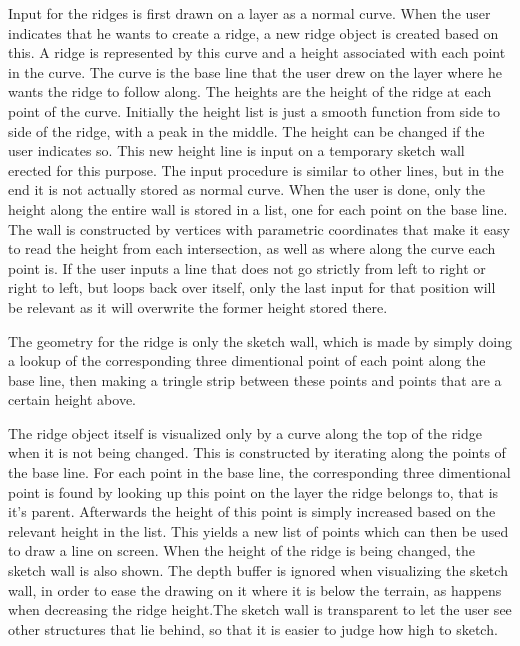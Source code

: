 \documentclass[a4paper,12pt]{report}
\begin{document}
Input for the ridges is first drawn on a layer as a normal curve. When the user indicates that he wants to create a ridge, a new ridge object is created based on this. A ridge is represented by this curve and a height associated with each point in the curve. The curve is the base line that the user drew on the layer where he wants the ridge to follow along. The heights are the height of the ridge at each point of the curve. Initially the height list is just a smooth function from side to side of the ridge, with a peak in the middle. The height can be changed if the user indicates so. This new height line is input on a temporary sketch wall erected for this purpose. The input procedure is similar to other lines, but in the end it is not actually stored as normal curve. When the user is done, only the height along the entire wall is stored in a list, one for each point on the base line. The wall is constructed by vertices with parametric coordinates that make it easy to read the height from each intersection, 
as 
well as where along the curve each point is. If the user inputs a line that does not go strictly from left to right or right to left, but loops back over itself, only the last input for that position will be relevant as it will overwrite the former height stored there.

The geometry for the ridge is only the sketch wall, which is made by simply doing a lookup of the corresponding three dimentional point of each point along the base line, then making a tringle strip between these points and points that are a certain height above.

The ridge object itself is visualized only by a curve along the top of the ridge when it is not being changed. This is constructed by iterating along the points of the base line. For each point in the base line, the corresponding three dimentional point is found by looking up this point on the layer the ridge belongs to, that is it's parent. Afterwards the height of this point is simply increased based on the relevant height in the list. This yields a new list of points which can then be used to draw a line on screen. When the height of the ridge is being changed, the sketch wall is also shown. The depth buffer is ignored when visualizing the sketch wall, in order to ease the drawing on it where it is below the terrain, as happens when decreasing the ridge height.The sketch wall is transparent to let the user see other structures that lie behind, so that it is easier to judge how high to sketch.
\end{document}
